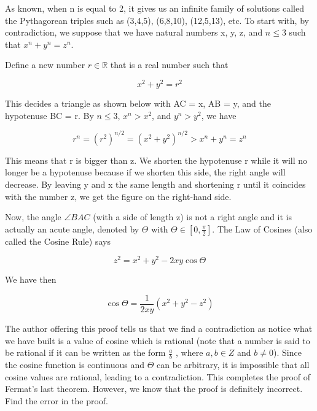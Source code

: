 \documentclass{article}
\begin{document}
As known, when n is equal to 2, it gives us an infinite family of solutions called the Pythagorean triples such as (3,4,5), (6,8,10), (12,5,13), etc. To start with, by contradiction, we suppose that we have natural numbers x, y, z, and $n \leq 3$ such that $x^n + y^n = z^n$.

Define a new number $r \in \mathbb{R} $ that is a real number such that

\begin{equation*}
  x^2 + y^2 = r^2
\end{equation*}

This decides a triangle as shown below with AC = x, AB = y, and the hypotenuse BC = r. By $n \leq 3$, $x^n > x^2$, and $y^n > y^2$, we have

\begin{equation*}
  r^n = (r^2)^{n/2} = (x^2 + y^2)^{n/2} > x^n + y^n = z^n
\end{equation*}

This means that r is bigger than z. We shorten the hypotenuse r while it will no longer be a hypotenuse because if we shorten this side, the right angle will decrease. By leaving y and x the same length and shortening r until it coincides with the number z, we get the figure on the right-hand side.

Now, the angle $\angle BAC$ (with a side of length z) is not a right angle and it is actually an acute angle, denoted by $\Theta$ with $\Theta \in [0, \frac{\pi}{2} ]$. The Law of Cosines (also called the Cosine Rule) says

\begin{equation*}
  z^2 = x^2 + y^2 - 2xy \cos \Theta
\end{equation*}

We have then

\begin{equation*}
  \cos \Theta = \frac{1}{2xy} (x^2 + y^2 - z^2)
\end{equation*}

The author offering this proof tells us that we find a contradiction as notice what we have built is a value of cosine which is rational (note that a number is said to be rational if it can be written as the form $\frac{a}{b} $ , where
$a, b \in Z$ and $b \neq 0$). Since the cosine function is continuous and $\Theta$ can be arbitrary, it is impossible that all cosine values are rational, leading to a contradiction. This completes the proof of Fermat’s last theorem. However, we know that the proof is definitely incorrect. Find the error in the proof.
\end{document}
